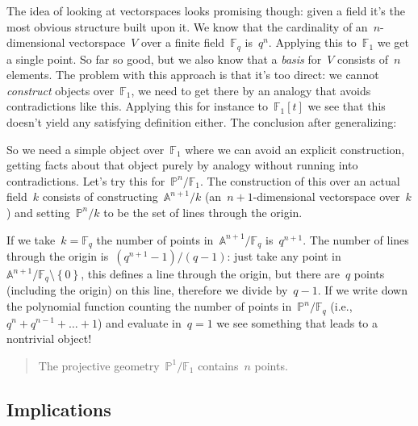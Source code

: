 The idea of looking at vectorspaces looks promising though: given a field it's the most obvious structure built upon it. We know that the cardinality of an~$n$\nobreakdash-dimensional vectorspace~$V$ over a finite field~$\mathbb{F}_q$ is~$q^n$. Applying this to~$\mathbb{F}_1$ we get a single point. So far so good, but we also know that a \emph{basis} for~$V$ consists of~$n$ elements. The problem with this approach is that it's too direct: we cannot \emph{construct} objects over~$\mathbb{F}_1$, we need to get there by an analogy that avoids contradictions like this. Applying this for instance to~$\mathbb{F}_1[t]$ we see that this doesn't yield any satisfying definition either. The conclusion after generalizing:

So we need a simple object over~$\mathbb{F}_1$ where we can avoid an explicit construction, getting facts about that object purely by analogy without running into contradictions. Let's try this for~$\mathbb{P}^n/\mathbb{F}_1$. The construction of this over an actual field~$k$ consists of constructing~$\mathbb{A}^{n+1}/k$ (an~$n+1$\nobreakdash-dimensional vectorspace over~$k$) and setting~$\mathbb{P}^n/k$ to be the set of lines through the origin.

If we take~$k=\mathbb{F}_q$ the number of points in~$\mathbb{A}^{n+1}/\mathbb{F}_q$ is~$q^{n+1}$. The number of lines through the origin is~$(q^{n+1}-1)/(q-1)$: just take any point in~$\mathbb{A}^{n+1}/\mathbb{F}_q\setminus\left\{ 0 \right\}$, this defines a line through the origin, but there are~$q$ points (including the origin) on this line, therefore we divide by~$q-1$. If we write down the polynomial function counting the number of points in~$\mathbb{P}^n/\mathbb{F}_q$ (i.e.,~$q^n+q^{n-1}+\ldots+1$) and evaluate in~$q=1$ we see something that leads to a nontrivial object! 

\begin{quote}
  The projective geometry~$\mathbb{P}^1/\mathbb{F}_1$ contains~$n$ points.
\end{quote}

\subsection{Implications}
